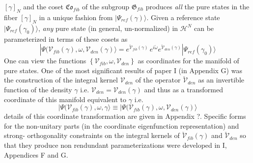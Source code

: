 \documentclass[aps,preprint]{revtex4}%
\begin{document}
$\left[  \gamma\right]  _{N}$ and the coset $\mathfrak{Co}_{fib}$ of the
subgroup $\mathfrak{G}_{fib}$ produces \emph{all }the pure states in the fiber
$\left[  \gamma\right]  _{N}$ in a unique fashion from $|\Psi_{ref}\left(
\gamma\right)  \rangle$. Given a reference state $|\Psi_{ref}\left(
\gamma_{0}\right)  \rangle$, \emph{any} pure state (in general, un-normalized)
in $\mathcal{H}^{N}$ can be parameterized in terms of these cosets as
\begin{equation}
|\Psi(\mathcal{V}_{fib}(\gamma),\omega,\mathcal{V}_{den}\left(  \gamma\right)
\rangle=e^{\mathcal{\breve{V}}_{fib}(\gamma)}\,e^{i\breve{\omega}%
}e^{\mathcal{\breve{V}}_{den}\left(  \gamma\right)  }|\Psi_{ref}\left(
\gamma_{0}\right)  \rangle\label{vv1omega1}%
\end{equation}
One can view the functions $\left\{  \mathcal{V}_{fib},\omega,\mathcal{V}%
_{den}\right\}  $ as coordinates for the manifold of pure states. One of the
most significant results of paper I (in Appendix G) was the construction of
the integral kernel $\mathcal{V}_{den}$ of the operator $\mathcal{\breve{V}%
}_{den}$ as an invertible function of the density $\gamma$ i.e. $\mathcal{V}%
_{den}=\mathcal{V}_{den}\left(  \gamma\right)  $ and thus as a transformed
coordinate of this manifold equivalent to $\gamma$ i.e.
\begin{equation}
|\Psi(\mathcal{V}_{fib}(\gamma),\omega,\mathcal{\gamma}\rangle\equiv
|\Psi(\mathcal{V}_{fib}(\gamma),\omega,\mathcal{V}_{den}\left(  \gamma\right)
\rangle
\end{equation}
details of this coordinate transformation are given in Appendix ?. Specific
forms for the non-unitary parts (in the coordinate eigenfunction
representation) and strong- orthogonality constraints on the integral kernels
of $\mathcal{\breve{V}}_{fib}(\gamma)$ and $\mathcal{\breve{V}}_{den}$ so that
they produce non rendundant parameterizations were developed in I, Appendices
F and G.
\end{document}

